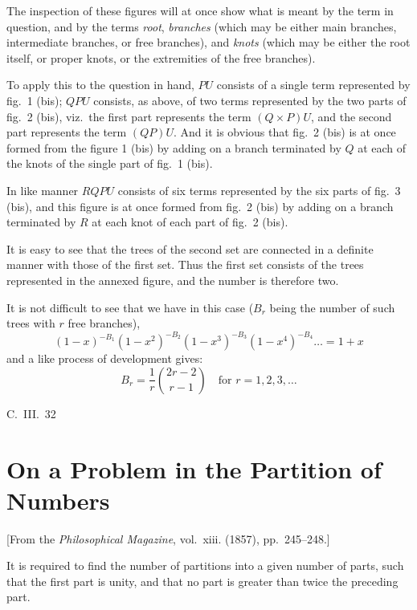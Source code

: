 \documentclass[11pt,a4paper]{article}
\theoremstyle{plain}
\begin{document}
The inspection of these figures will at once show what is meant by the term in question, and by the terms \textit{root}, \textit{branches} (which may be either main branches, intermediate branches, or free branches), and \textit{knots} (which may be either the root itself, or proper knots, or the extremities of the free branches).

To apply this to the question in hand, $PU$ consists of a single term represented by fig.~1 (bis); $QPU$ consists, as above, of two terms represented by the two parts of fig.~2 (bis), viz.\ the first part represents the term $(Q \times P)U$, and the second part represents the term $(QP)U$. And it is obvious that fig.~2 (bis) is at once formed from the figure 1 (bis) by adding on a branch terminated by $Q$ at each of the knots of the single part of fig.~1 (bis).

In like manner $RQPU$ consists of six terms represented by the six parts of fig.~3 (bis), and this figure is at once formed from fig.~2 (bis) by adding on a branch terminated by $R$ at each knot of each part of fig.~2 (bis).

It is easy to see that the trees of the second set are connected in a definite manner with those of the first set. Thus the first set consists of the trees represented in the annexed figure, and the number is therefore two.

It is not difficult to see that we have in this case ($B_r$ being the number of such trees with $r$ free branches),
\[
(1-x)^{-B_1}(1-x^2)^{-B_2}(1-x^3)^{-B_3}(1-x^4)^{-B_4}\ldots = 1 + x
\]
and a like process of development gives:
\[
B_r = \frac{1}{r}\binom{2r-2}{r-1} \quad \text{for } r = 1, 2, 3, \ldots
\]

\hfill C.~III.~32
\newpage


\section{On a Problem in the Partition of Numbers}
\label{sec:204}

[From the \textit{Philosophical Magazine}, vol.~xiii. (1857), pp.~245--248.]
\vspace{1em}

It is required to find the number of partitions into a given number of parts, such that the first part is unity, and that no part is greater than twice the preceding part.
\end{document}
